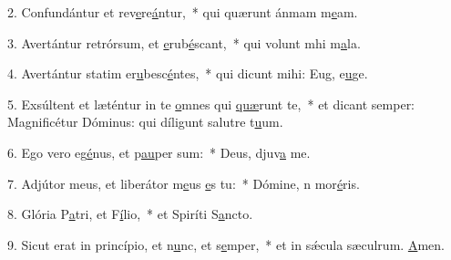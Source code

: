 2. Confundántur et rev\uline{e}re\uline{á}ntur,~* qui quærunt ánmam m\uline{e}am.\par 
3. Avertántur retrórsum, et \uline{e}rub\uline{é}scant,~* qui volunt mhi m\uline{a}la.\par 
4. Avertántur statim er\uline{u}besc\uline{é}ntes,~* qui dicunt mihi: Eug, e\uline{u}ge.\par 
5. Exsúltent et læténtur in te \uline{o}mnes qui \uline{quæ}runt te,~* et dicant semper: Magnificétur Dóminus: qui díligunt salutre t\uline{u}um.\par 
6. Ego vero eg\uline{é}nus, et p\uline{au}per sum:~* Deus, djuv\uline{a} me.\par 
7. Adjútor meus, et liberátor m\uline{e}us \uline{e}s tu:~* Dómine, n mor\uline{é}ris.\par 
8. Glória P\uline{a}tri, et F\uline{í}lio,~* et Spiríti S\uline{a}ncto.\par 
9. Sicut erat in princípio, et n\uline{u}nc, et s\uline{e}mper,~* et in sǽcula sæculrum. \uline{A}men.\par 

